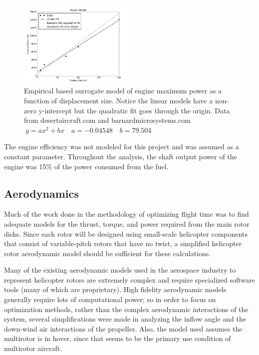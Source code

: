 \documentclass[letterpaper, 10 pt, conference]{ieeeconf}  %
\begin{document}
\begin{figure}
	\includegraphics[width=0.5\textwidth]{max_power.png}
	\caption{Empirical based surrogate model of engine maximum power as a function of displacement size. Notice the linear models have a non-zero y-intercept but the quadratic fit goes through the origin. Data from desertaircraft.com \cite{da2016} and barnardmicrosystems.com \cite{barnardmiro2016} $\ y = ax^2 + bx \quad a = -0.04548 \quad b = 79.504$}
		\label{fig:power}
\end{figure}


The engine efficiency was not modeled for this project and was assumed as a constant parameter.  Throughout the analysis, the shaft output power of the engine was 15\% of the power consumed from the fuel.  

\subsection{Aerodynamics}

Much of the work done in the methodology of optimizing flight time was to find adequate models for the thrust, torque, and power required from the main rotor disks. Since each rotor will be designed using small-scale helicopter components that consist of variable-pitch rotors that have no twist, a simplified helicopter rotor aerodynamic model should be sufficient for these calculations. 

Many of the existing aerodynamic models used in the aerospace industry to represent helicopter rotors are extremely complex and require specialized software tools (many of which are proprietary). High fidelity aerodynamic models generally require lots of computational power; so in order to focus on optimization methods, rather than the complex aerodynamic interactions of the system, several simplifications were made in analyzing the inflow angle and the down-wind air interactions of the propeller. Also, the model used assumes the multirotor is in hover, since that seems to be the primary use condition of multirotor aircraft.
\end{document}
